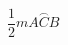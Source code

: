 \documentclass[preview]{standalone}
\begin{document}
\begin{center}
$\dfrac{1}{2}$$m\overset{\frown}{ACB}$
\end{center}
\end{document}
